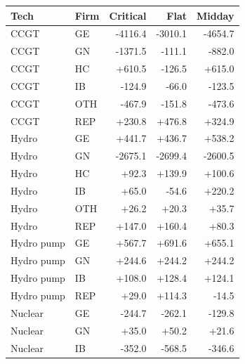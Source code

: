 \begin{tabular}{l l r r r}
\toprule
Tech & Firm & Critical & Flat & Midday \\
\midrule
CCGT & GE & -4116.4 & -3010.1 & -4654.7 \\
CCGT & GN & -1371.5 & -111.1 & -882.0 \\
CCGT & HC & +610.5 & -126.5 & +615.0 \\
CCGT & IB & -124.9 & -66.0 & -123.5 \\
CCGT & OTH & -467.9 & -151.8 & -473.6 \\
CCGT & REP & +230.8 & +476.8 & +324.9 \\
Hydro & GE & +441.7 & +436.7 & +538.2 \\
Hydro & GN & -2675.1 & -2699.4 & -2600.5 \\
Hydro & HC & +92.3 & +139.9 & +100.6 \\
Hydro & IB & +65.0 & -54.6 & +220.2 \\
Hydro & OTH & +26.2 & +20.3 & +35.7 \\
Hydro & REP & +147.0 & +160.4 & +80.3 \\
Hydro pump & GE & +567.7 & +691.6 & +655.1 \\
Hydro pump & GN & +244.6 & +244.2 & +244.2 \\
Hydro pump & IB & +108.0 & +128.4 & +124.1 \\
Hydro pump & REP & +29.0 & +114.3 & -14.5 \\
Nuclear & GE & -244.7 & -262.1 & -129.8 \\
Nuclear & GN & +35.0 & +50.2 & +21.6 \\
Nuclear & IB & -352.0 & -568.5 & -346.6 \\
\bottomrule
\end{tabular}